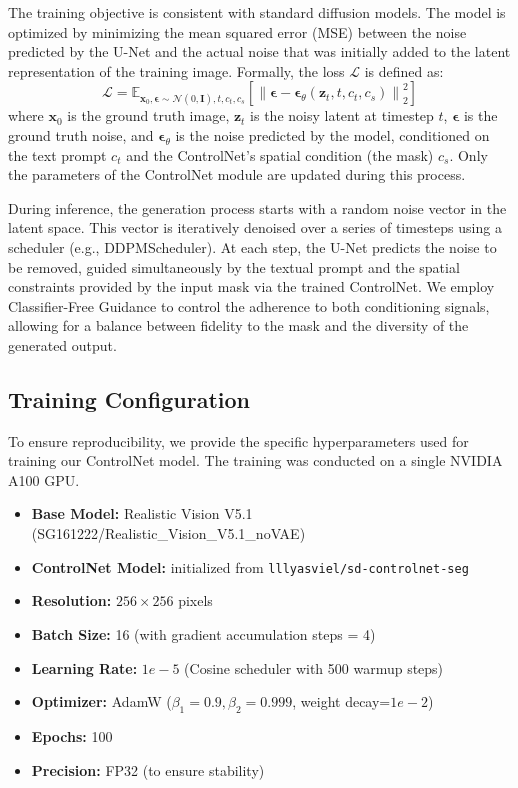 \documentclass[a4paper,11pt]{article}
\begin{document}
The training objective is consistent with standard diffusion models. The model is optimized by minimizing the mean squared error (MSE) between the noise predicted by the U-Net and the actual noise that was initially added to the latent representation of the training image. Formally, the loss $\mathcal{L}$ is defined as:
\[
\mathcal{L} = \mathbb{E}_{\mathbf{x}_0, \boldsymbol{\epsilon} \sim \mathcal{N}(0, \mathbf{I}), t, c_t, c_s} \left[ \left\| \boldsymbol{\epsilon} - \boldsymbol{\epsilon}_\theta(\mathbf{z}_t, t, c_t, c_s) \right\|^2_2 \right]
\]
where $\mathbf{x}_0$ is the ground truth image, $\mathbf{z}_t$ is the noisy latent at timestep $t$, $\boldsymbol{\epsilon}$ is the ground truth noise, and $\boldsymbol{\epsilon}_\theta$ is the noise predicted by the model, conditioned on the text prompt $c_t$ and the ControlNet's spatial condition (the mask) $c_s$. Only the parameters of the ControlNet module are updated during this process.

During inference, the generation process starts with a random noise vector in the latent space. This vector is iteratively denoised over a series of timesteps using a scheduler (e.g., DDPMScheduler). At each step, the U-Net predicts the noise to be removed, guided simultaneously by the textual prompt and the spatial constraints provided by the input mask via the trained ControlNet. We employ Classifier-Free Guidance to control the adherence to both conditioning signals, allowing for a balance between fidelity to the mask and the diversity of the generated output.

\subsection{Training Configuration}
To ensure reproducibility, we provide the specific hyperparameters used for training our ControlNet model. The training was conducted on a single NVIDIA A100 GPU.

\begin{itemize}
    \item \textbf{Base Model:} Realistic Vision V5.1 (SG161222/Realistic\_Vision\_V5.1\_noVAE)
    \item \textbf{ControlNet Model:} initialized from \texttt{lllyasviel/sd-controlnet-seg}
    \item \textbf{Resolution:} $256 \times 256$ pixels
    \item \textbf{Batch Size:} 16 (with gradient accumulation steps = 4)
    \item \textbf{Learning Rate:} $1e-5$ (Cosine scheduler with 500 warmup steps)
    \item \textbf{Optimizer:} AdamW ($\beta_1=0.9, \beta_2=0.999$, weight decay=$1e-2$)
    \item \textbf{Epochs:} 100
    \item \textbf{Precision:} FP32 (to ensure stability)
\end{itemize}
\end{document}
